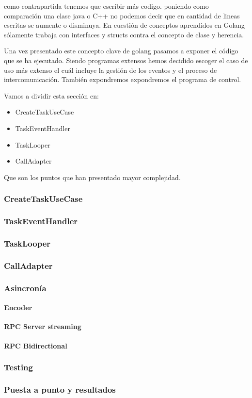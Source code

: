 como contrapartida tenemos que escribir más codigo. poniendo como comparación una clase java o C++ no podemos decir que en cantidad de lineas escritas se aumente o disminuya. En cuestión de conceptos aprendidos en Golang sólamente trabaja con interfaces y structs contra el concepto de clase y herencia.

Una vez presentado este concepto clave de golang pasamos a exponer el código que se ha ejecutado. Siendo programas extensos hemos decidido escoger el caso de uso más extenso el cuál incluye la gestión de los eventos y el proceso de intercomunicación. También expondremos expondremos el programa de control.

Vamos a dividir esta sección en:
\begin{itemize}
    \item CreateTaskUseCase
    \item TaskEventHandler
    \item TaskLooper
    \item CallAdapter
\end{itemize}

Que son los puntos que han presentado mayor complejidad.

\subsubsection{CreateTaskUseCase}
    
\subsubsection{TaskEventHandler}
%    
\subsubsection{TaskLooper}
%    
\subsubsection{CallAdapter}
%    
\subsubsection{Asincronía}\label{subsec:asincronia}
    \paragraph{Encoder}
    \paragraph{RPC Server streaming}
    \paragraph{RPC Bidirectional}
\subsubsection{Testing}
\subsubsection{Puesta a punto y resultados}